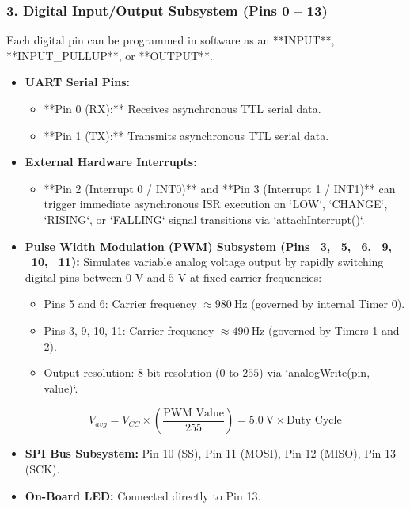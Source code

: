 \subsubsection{3. Digital Input/Output Subsystem (Pins 0 – 13)}
Each digital pin can be programmed in software as an **INPUT**, **INPUT\_PULLUP**, or **OUTPUT**.
\begin{itemize}
    \item \textbf{UART Serial Pins:}
    \begin{itemize}
        \item **Pin 0 (RX):** Receives asynchronous TTL serial data.
        \item **Pin 1 (TX):** Transmits asynchronous TTL serial data.
    \end{itemize}
    \item \textbf{External Hardware Interrupts:}
    \begin{itemize}
        \item **Pin 2 (Interrupt 0 / INT0)** and **Pin 3 (Interrupt 1 / INT1)** can trigger immediate asynchronous ISR execution on `LOW`, `CHANGE`, `RISING`, or `FALLING` signal transitions via `attachInterrupt()`.
    \end{itemize}
    \item \textbf{Pulse Width Modulation (PWM) Subsystem (Pins ~3, ~5, ~6, ~9, ~10, ~11):}
    Simulates variable analog voltage output by rapidly switching digital pins between $0\text{ V}$ and $5\text{ V}$ at fixed carrier frequencies:
    \begin{itemize}
        \item Pins 5 and 6: Carrier frequency $\approx \SI{980}{\hertz}$ (governed by internal Timer 0).
        \item Pins 3, 9, 10, 11: Carrier frequency $\approx \SI{490}{\hertz}$ (governed by Timers 1 and 2).
        \item Output resolution: 8-bit resolution ($0$ to $255$) via `analogWrite(pin, value)`.
    \end{itemize}
    \begin{equation}
        V_{avg} = V_{CC} \times \left( \frac{\text{PWM Value}}{255} \right) = \SI{5.0}{\volt} \times \text{Duty Cycle}
    \end{equation}
    \item \textbf{SPI Bus Subsystem:} Pin 10 (SS), Pin 11 (MOSI), Pin 12 (MISO), Pin 13 (SCK).
    \item \textbf{On-Board LED:} Connected directly to Pin 13.
\end{itemize}

